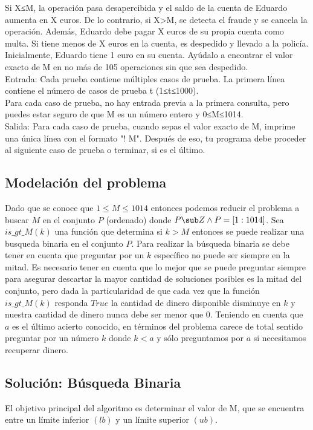 \documentclass[
10pt, %
a4paper, %
oneside, %
headinclude,footinclude, %
BCOR5mm, %
]{scrartcl}
\begin{document}
Si X≤M, la operación pasa desapercibida y el saldo de la cuenta de Eduardo aumenta en X euros.  
De lo contrario, si X>M, se detecta el fraude y se cancela la operación. Además, Eduardo debe pagar X euros de su propia cuenta como multa. Si tiene menos de X euros en la cuenta, es despedido y llevado a la policía.  
Inicialmente, Eduardo tiene 1 euro en su cuenta. Ayúdalo a encontrar el valor exacto de M en no más de 105 operaciones sin que sea despedido.\\

Entrada:
Cada prueba contiene múltiples casos de prueba. La primera línea contiene el número de casos de prueba t (1≤t≤1000).\\

Para cada caso de prueba, no hay entrada previa a la primera consulta, pero puedes estar seguro de que M es un número entero y 0≤M≤1014.\\

Salida:
Para cada caso de prueba, cuando sepas el valor exacto de M, imprime una única línea con el formato "! M". Después de eso, tu programa debe proceder al siguiente caso de prueba o terminar, si es el último.\\


\subsection{Modelación del problema}

Dado que se conoce que $1 \leq M \leq 1014$ entonces podemos reducir el problema a buscar $M$ en el conjunto $P$ (ordenado) donde $P \sub Z \wedge P = [1:1014]$. Sea $is\_ gt\_ M(k)$ una función que determina si $k > M$ entonces se puede realizar una busqueda binaria en el conjunto $P$.
Para realizar la búsqueda binaria se debe tener en cuenta que preguntar por un $k$ específico no puede ser siempre en la mitad. Es necesario tener en cuenta que lo mejor que se puede preguntar siempre para asegurar descartar la mayor cantidad de soluciones posibles es la mitad del conjunto,
pero dada la particularidad de que cada vez que la función $is\_ gt\_ M(k)$ responda $True$ la cantidad de dinero disponible disminuye en $k$ y nuestra cantidad de dinero nunca debe  ser menor que $0$.
Teniendo en cuenta que $a$ es el último acierto conocido, en términos del problema carece de total sentido preguntar por un número $k$ donde $k<a$ y sólo preguntamos por $a$ si necesitamos recuperar dinero. 

\subsection{Solución: Búsqueda Binaria}
El objetivo principal del algoritmo es determinar el valor de M, que se encuentra entre un límite inferior $(lb)$ y un límite superior $(ub)$. 
\end{document}
